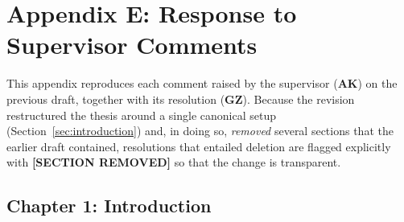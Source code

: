 \section{Appendix E: Response to Supervisor Comments}\label{sec:appendix-response-to-comments}

This appendix reproduces each comment raised by the supervisor (\textbf{AK}) on the previous draft, together with its resolution (\textbf{GZ}). Because the revision restructured the thesis around a single canonical setup (Section~\ref{sec:introduction}) and, in doing so, \emph{removed} several sections that the earlier draft contained, resolutions that entailed deletion are flagged explicitly with \textbf{[SECTION REMOVED]} so that the change is transparent.

\subsection*{Chapter 1: Introduction}

